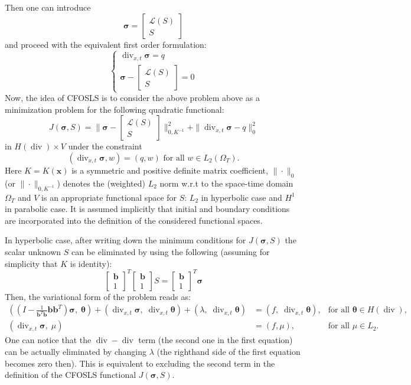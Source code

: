 \documentclass[12pt]{article}
\renewcommand{\div}{\operatorname{div}}
\def\bb{{\mathbf b}}
\def\btheta{{\boldsymbol \theta}}
\def\bsigma{{\boldsymbol \sigma}}
\begin{document}
Then one can introduce 
$$
\bsigma = \left[ \begin{array}{c} \mathcal{L}(S) \\ S \end{array} \right]
$$
and proceed with the equivalent first order formulation:
$$
\left\{
\begin{array}{c}
\operatorname{div}_{x,t} \bsigma = q \\
\bsigma - 
\left[ 
\begin{array}{c} \mathcal{L}(S) \\ S \end{array}
\right] = 0
\end{array}
\right.
$$
Now, the idea of CFOSLS \cite{CFOSLS} is to consider the above problem above as a minimization problem for the following quadratic functional:
$$
J(\bsigma,S) = \| \bsigma - \left[ \begin{array}{c} \mathcal{L}(S) \\ S \end{array} \right] \|^2_{0,K^{-1}} + \| \operatorname{\div}_{x,t} \bsigma - q \|^2_0
$$
in $H(\div) \times V$ under the constraint
$$
(\operatorname{div}_{x,t} \bsigma, w) = (q, w) \, \, \text{for all} \, \, w \in L_2(\Omega_T).
$$
Here $K = K(\mathbf{x})$ is a symmetric and positive definite matrix coefficient, $\| \cdot \|_0$ (or $\| \cdot \|_{0,K^{-1}}$) denotes the (weighted) $L_2$ norm w.r.t to the space-time domain $\Omega_T$ and $V$ is an appropriate functional space for $S$: $L_2$ in hyperbolic case and $H^1$ in parabolic case. It is assumed implicitly that initial and boundary conditions are incorporated into the definition of the considered functional spaces.

In hyperbolic case, after writing down the minimum conditions for $J(\bsigma,S)$ the scalar unknown $S$  can be eliminated by using the following (assuming for simplicity that $K$ is identity):
$$
\left[ 
\begin{array}{c} \mathbf{b} \\ 1 \end{array}
\right]^T
\left[ 
\begin{array}{c} \mathbf{b} \\ 1 \end{array}
\right]
 S = \left[ 
\begin{array}{c} \mathbf{b} \\ 1 \end{array}
\right]^T \bsigma
$$
Then, the variational form of the problem reads as:
$$
\begin{array}{lll}
((I- \frac{1}{\bb^T\bb} \bb\bb^T) \bsigma,\;\btheta)+(\div_{x,t} \bsigma,\;\div_{x,t} \btheta)+(\lambda,\;\div_{x,t} \btheta)&= (f,\;\div_{x,t} \btheta),&\text{for all }\btheta \in H(\div),\\
(\div_{x,t} \bsigma,\;\mu)&= (f,\mu),&\text{for all }\mu \in L_2.
\end{array}
$$
One can notice that the $\div-\div$ term (the second one in the first equation) can be actually eliminated by changing $\lambda$ (the righthand side of the first equation becomes zero then). This is equivalent to excluding the second term in the definition of the CFOSLS functional $J(\bsigma,S)$.
\end{document}
